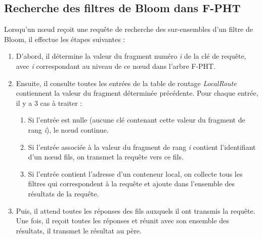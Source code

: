 \documentclass[a4paper,11pt]{report}
\begin{document}
\subsection{Recherche des filtres de Bloom dans F-PHT}
	Lorsqu'un nœud reçoit une requête de recherche des sur-ensembles d'un filtre de Bloom, il effectue les étapes suivantes :
	\begin{enumerate}
		\item D'abord, il détermine la valeur du fragment numéro \textit{i} de la clé de requête, avec \textit{i} correspondant au niveau de ce nœud dans l'arbre F-PHT.
		\item Ensuite, il consulte toutes les entrées de la table de routage \textit{LocalRoute} contiennent la valeur du fragment déterminée précédente. Pour chaque entrée, il y a 3 cas à traiter :
		\begin{enumerate}
			\item Si l'entrée est nulle (aucune clé contenant cette valeur du fragment de rang \textit{i}), le nœud continue.
			\item Si l'entrée associée à la valeur du fragment de rang \textit{i} contient l'identifiant d'un nœud fils, on transmet la requête vers ce fils.
			\item Si l'entrée contient l'adresse d'un conteneur local, on collecte tous les filtres qui correspondent à la requête et ajoute dans l'ensemble des résultats de la requête.
		\end{enumerate}
		\item Puis, il attend toutes les réponses des fils auxquels il ont transmis la requête. Une fois, il reçoit toutes les réponses et réunit avec son ensemble des résultats, il transmet le résultat au père.
	\end{enumerate}
	
\end{document}
